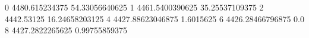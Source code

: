 0 4480.615234375 54.33056640625
1 4461.5400390625 35.25537109375
2 4442.53125 16.24658203125
4 4427.88623046875 1.6015625
6 4426.28466796875 0.0
8 4427.2822265625 0.99755859375
